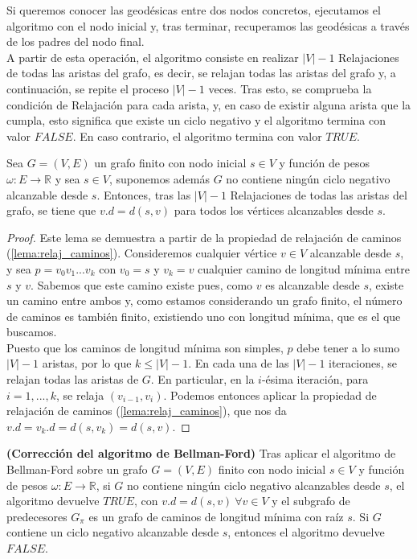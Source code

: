 Si queremos conocer las geodésicas entre dos nodos concretos, ejecutamos el algoritmo con el nodo inicial y, tras terminar, recuperamos las geodésicas a través de los padres del nodo final. \\

A partir de esta operación, el algoritmo consiste en realizar $|V|-1$ Relajaciones de todas las aristas del grafo, es decir, se relajan todas las aristas del grafo y, a continuación, se repite el proceso $|V|-1$ veces. Tras esto, se comprueba la condición de Relajación para cada arista, y, en caso de existir alguna arista que la cumpla, esto significa que existe un ciclo negativo y el algoritmo termina con valor $FALSE$. En caso contrario, el algoritmo termina con valor $TRUE$. \\

\begin{lema}\label{lema:corr_Bell_Ford}
	Sea $G=(V,E)$ un grafo finito con nodo inicial $s\in V$ y función de pesos $\omega : E\rightarrow \mathbb{R}$ y sea $s\in V$, suponemos además $G$ no contiene ningún ciclo negativo alcanzable desde $s$. Entonces, tras las $|V|-1$ Relajaciones de todas las aristas del grafo, se tiene que $v.d = d(s,v)$ para todos los vértices alcanzables desde $s$.
\end{lema}

\begin{proof}
	Este lema se demuestra a partir de la propiedad de relajación de caminos (\autoref{lema:relaj_caminos}). Consideremos cualquier vértice $v\in V$ alcanzable desde $s$, y sea $p = v_0v_1...v_k$ con $v_0=s$ y $v_k=v$ cualquier camino de longitud mínima entre $s$ y $v$. Sabemos que este camino existe pues, como $v$ es alcanzable desde $s$, existe un camino entre ambos y, como estamos considerando un grafo finito, el número de caminos es también finito, existiendo uno con longitud mínima, que es el que buscamos. \\
	Puesto que los caminos de longitud mínima son simples, $p$ debe tener a lo sumo $|V|-1$ aristas, por lo que $k\leq|V|-1$. En cada una de las $|V|-1$ iteraciones, se relajan todas las aristas de $G$. En particular, en la $i$-ésima iteración, para $i=1,...,k$, se relaja $(v_{i-1},v_i)$. Podemos entonces aplicar la propiedad de relajación de caminos (\autoref{lema:relaj_caminos}), que nos da $v.d=v_k.d=d(s,v_k)=d(s,v)$.
\end{proof}

\begin{proposicion}
	\textbf{(Corrección del algoritmo de Bellman-Ford)} Tras aplicar el algoritmo de Bellman-Ford sobre un grafo $G=(V,E)$ finito con nodo inicial $s\in V$ y función de pesos $\omega : E\rightarrow \mathbb{R}$, si $G$ no contiene ningún ciclo negativo alcanzables desde $s$, el algoritmo devuelve $TRUE$, con $v.d=d(s,v)\ \forall v\in V$ y el subgrafo de predecesores $G_{\pi}$ es un grafo de caminos de longitud mínima con raíz $s$. Si $G$ contiene un ciclo negativo alcanzable desde $s$, entonces el algoritmo devuelve $FALSE$.
\end{proposicion}

